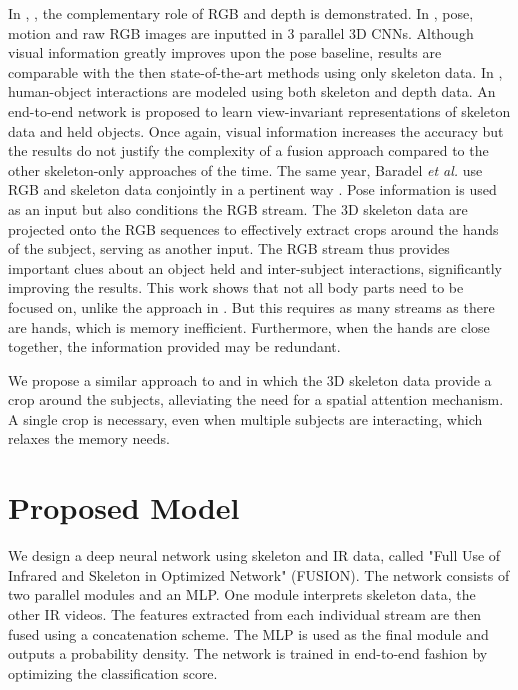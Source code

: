\documentclass[letterpaper, 10 pt, conference]{ieeeconf}
\begin{document}
In \cite{hu2018deep}, \cite{shahroudy2017deep}, \cite{wang2018cooperative} the complementary role of RGB and depth is demonstrated. In \cite{zolfaghari2017chained}, pose, motion and raw RGB images are inputted in 3 parallel 3D CNNs. Although visual information greatly improves upon the pose baseline, results are comparable with the then state-of-the-art methods using only skeleton data. In \cite{rahmani2017learning}, human-object interactions are modeled using both skeleton and depth data. An end-to-end network is proposed to learn view-invariant representations of skeleton data and held objects. Once again, visual information increases the accuracy but the results do not justify the complexity of a fusion approach compared to the other skeleton-only approaches of the time. The same year, Baradel \textit{et al.} use RGB and skeleton data conjointly in a pertinent way \cite{baradel2017pose}. Pose information is used as an input but also conditions the RGB stream. The 3D skeleton data are projected onto the RGB sequences to effectively extract crops around the hands of the subject, serving as another input. The RGB stream thus provides important clues about an object held and inter-subject interactions, significantly improving the results. This work shows that not all body parts need to be focused on, unlike the approach in \cite{rahmani2017learning}. But this requires as many streams as there are hands, which is memory inefficient. Furthermore, when the hands are close together, the information provided may be redundant. 

We propose a similar approach to \cite{baradel2017pose} and \cite{rahmani2017learning} in which the 3D skeleton data provide a crop around the subjects, alleviating the need for a spatial attention mechanism. A single crop is necessary, even when multiple subjects are interacting, which relaxes the memory needs.




\section{Proposed Model}

We design a deep neural network using skeleton and IR data, called "Full Use of Infrared and Skeleton in Optimized Network" (FUSION). The network consists of two parallel modules and an MLP. One module interprets skeleton data, the other IR videos. The features extracted from each individual stream are then fused using a concatenation scheme. The MLP is used as the final module and outputs a probability density. The network is trained in end-to-end fashion by optimizing the classification score. 
\end{document}
